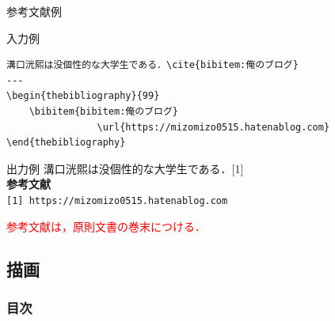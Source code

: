 \documentclass[dvipdfmx]{beamer}
\begin{document}
\begin{frame}[fragile]{参考文献例}
    \begin{exampleblock}{入力例}
        \begin{verbatim}
溝口洸熙は没個性的な大学生である．\cite{bibitem:俺のブログ}
---
\begin{thebibliography}{99}
    \bibitem{bibitem:俺のブログ} 
                \url{https://mizomizo0515.hatenablog.com}
\end{thebibliography}
        \end{verbatim}
    \end{exampleblock}
    \begin{exampleblock}{出力例}
        溝口洸熙は没個性的な大学生である．[1]\\
        \textbf{参考文献}\\
        \verb|[1] https://mizomizo0515.hatenablog.com|
    \end{exampleblock}
    \textcolor{red}{参考文献は，原則文書の巻末につける．}
\end{frame}


\subsection{描画}
\begin{frame}
\frametitle{目次}
\tableofcontents[currentsection,sectionstyle=show/shaded,subsectionstyle=show/shaded]
\end{frame}
\end{document}
